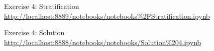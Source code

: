 \begin{frame}{Exercise 4: Stratification}
    \centering
    \vfill
    \scriptsize{\url{http://localhost:8889/notebooks/notebooks\%2FStratification.ipynb}}
    \vfill
\end{frame}

\begin{frame}{Exercise 4: Solution}
    \centering
    \vfill
    \scriptsize{\url{http://localhost:8888/notebooks/notebooks/Solution\%204.ipynb}}
    \vfill
\end{frame}
